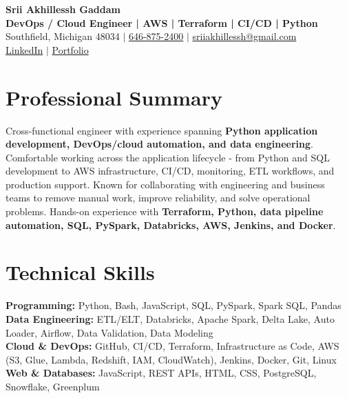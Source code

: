 \documentclass[letterpaper,10pt]{article}
\begin{document}
\fontsize{9.35pt}{10.45pt}\selectfont

\begin{center}
    {\LARGE \textbf{Srii Akhillessh Gaddam}} \\[-1pt]
    \textbf{DevOps / Cloud Engineer | AWS | Terraform | CI/CD | Python} \\[2pt]
    Southfield, Michigan 48034 $|$
    \href{tel:6468752400}{646-875-2400} $|$
    \href{mailto:sriiakhillessh@gmail.com}{sriiakhillessh@gmail.com} \\[1pt]
    \href{https://www.linkedin.com/in/srii-akhiilessh-gaddam-b48668191/}{LinkedIn} $|$
    \href{https://sriiakhillesshg.github.io/portfolio/}{Portfolio}
\end{center}
\vspace{-8pt}

\section{Professional Summary}
\small{Cross-functional engineer with experience spanning \textbf{Python application development, DevOps/cloud automation, and data engineering}. Comfortable working across the application lifecycle - from Python and SQL development to AWS infrastructure, CI/CD, monitoring, ETL workflows, and production support. Known for collaborating with engineering and business teams to remove manual work, improve reliability, and solve operational problems. Hands-on experience with \textbf{Terraform, Python, data pipeline automation, SQL, PySpark, Databricks, AWS, Jenkins, and Docker}.}

\section{Technical Skills}
\small{
\textbf{Programming:} Python, Bash, JavaScript, SQL, PySpark, Spark SQL, Pandas \\
\textbf{Data Engineering:} ETL/ELT, Databricks, Apache Spark, Delta Lake, Auto Loader, Airflow, Data Validation, Data Modeling \\
\textbf{Cloud \& DevOps:} GitHub, CI/CD, Terraform, Infrastructure as Code, AWS (S3, Glue, Lambda, Redshift, IAM, CloudWatch), Jenkins, Docker, Git, Linux \\
\textbf{Web \& Databases:} JavaScript, REST APIs, HTML, CSS, PostgreSQL, Snowflake, Greenplum
}
\end{document}
